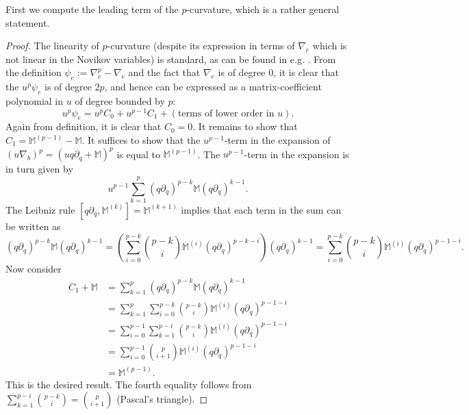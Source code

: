 \documentclass[reqno]{amsart}
\numberwithin{equation}{section}
\numberwithin{equation}{section}
\numberwithin{equation}{section}
\newtheorem{lemma}[thm]{Lemma}
\theoremstyle{definition}
\theoremstyle{remark}
\theoremstyle{remark}
\begin{document}
First we compute the leading term of the $p$-curvature, which is a rather general statement.
\begin{proof}
    The linearity of $p$-curvature (despite its expression in terms of $\nabla_e$ which is not linear in the Novikov variables) is standard, as can be found in e.g. \cite[Section 5]{Kat70}. From the definition $\psi_e:= \nabla_e^p - \nabla_e$ and the fact that $\nabla_e$ is of degree $0$, it is clear that the $u^p \psi_e $ is of degree $2p$, and hence can be expressed as a matrix-coefficient polynomial in $u$ of degree bounded by $p$:
    \begin{equation}
        u^p\psi_e = u^p C_0 + u^{p-1}C_1 + \left( \mbox{terms of lower order in } u \right).
    \end{equation}
    Again from definition, it is clear that $C_0 = 0$. It remains to show that $C_1 = \mathbb{M}^{(p-1)} - \mathbb{M}$. It suffices to show that the $u^{p-1}$-term in the expansion of $(u\nabla_b)^p = (u q\partial_q + \mathbb{M})^p$ is equal to $\mathbb{M}^{(p-1)}$. The $u^{p-1}$-term in the expansion is in turn given by
    \begin{equation}
       u^{p-1}  \sum_{k=1}^{p} (q\partial_q)^{p-k} \mathbb{M} (q\partial_q)^{k-1}.
    \end{equation}
    The Leibniz rule $[q\partial_q, \mathbb{M}^{(k)}] = \mathbb{M}^{(k+1)}$ implies that each term in the sum can be written as
    \begin{equation}
         (q\partial_q)^{p-k} \mathbb{M} (q\partial_q)^{k-1} = \left( \sum_{i=0}^{p-k} \binom{p-k}{i} \mathbb{M}^{(i)} (q\partial_q)^{p-k-i} \right)  (q\partial_q)^{k-1} = \sum_{i=0}^{p-k}\binom{p-k}{i} \mathbb{M}^{(i)} (q\partial_q)^{p-1-i}.
    \end{equation}
    Now consider
    \begin{align}
   C_1 +\mathbb{M}  &= \sum_{k=1}^{p} (q\partial_q)^{p-k} \mathbb{M} (q\partial_q)^{k-1} \\
        &= \sum_{k=1}^{p}   \sum_{i=0}^{p-k} \binom{p-k}{i} \mathbb{M}^{(i)} (q\partial_q)^{p-1-i} 
        \\
&= \sum_{i=0}^{p-1} \sum_{k=1}^{p-i}  \binom{p-k}{i} \mathbb{M}^{(i)} (q\partial_q)^{p-1-i} \\
&= \sum_{i=0}^{p-1} \binom{p}{i+1} \mathbb{M}^{(i)} (q\partial_q)^{p-1-i} \\
&= \mathbb{M}^{(p-1)}.
    \end{align}
    This is the desired result. The fourth equality follows from $\sum_{k=1}^{p-i} \binom{p-k}{i} = \binom{p}{i+1}$ (Pascal's triangle).
\end{proof}
\end{document}
